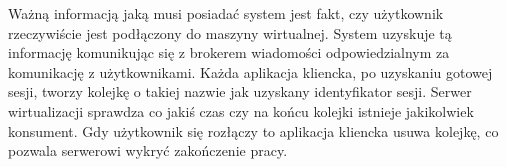 \documentclass[../opis-rozwiazania.tex]{subfiles}
\begin{document}
\label{communication:user-broker}

Ważną informacją jaką musi posiadać system jest fakt, czy użytkownik rzeczywiście jest podłączony do maszyny wirtualnej.
System uzyskuje tą informację komunikując się z brokerem wiadomości odpowiedzialnym za komunikację z użytkownikami.
Każda aplikacja kliencka, po uzyskaniu gotowej sesji, tworzy kolejkę o takiej nazwie jak uzyskany identyfikator sesji.
Serwer wirtualizacji sprawdza co jakiś czas czy na końcu kolejki istnieje jakikolwiek konsument.
Gdy użytkownik się rozłączy to aplikacja kliencka usuwa kolejkę, co pozwala serwerowi wykryć zakończenie pracy.
\end{document}
